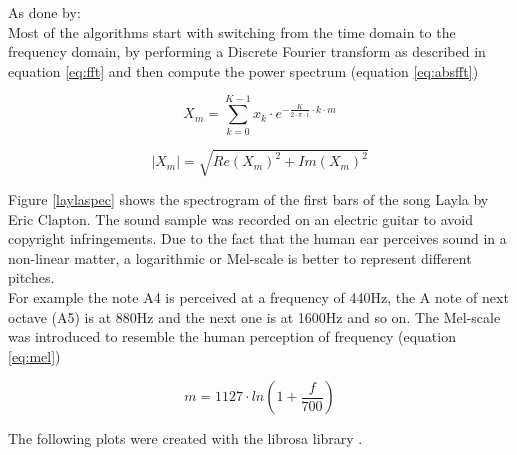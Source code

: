 As done by: \cite[pp. 17ff]{schnitzer1}\\
Most of the algorithms start with switching from the time domain to the frequency domain, by performing a Discrete Fourier transform as described in equation \ref{eq:fft} and then compute the power spectrum (equation \ref{eq:absfft})

\begin{equation} \label{eq:fft}
X_m = \sum_{k=0}^{K-1}{x_k \cdot e^ { - \frac{K}{ 2 \cdot \pi \cdot i}\cdot k\cdot m}}
\end{equation}

\begin{equation} \label{eq:absfft}
|X_m| = \sqrt{Re(X_m)^2 + Im(X_m)^2}
\end{equation}

Figure \ref{laylaspec} shows the spectrogram of the first bars of the song Layla by Eric Clapton. The sound sample was recorded on an electric guitar to avoid copyright infringements. 
Due to the fact that the human ear perceives sound in a non-linear matter, a logarithmic or Mel-scale is better to represent different pitches.\\ 
For example the note A4 is perceived at a frequency of 440Hz, the A note of next octave (A5) is at 880Hz and the next one is at 1600Hz and so on. 
The Mel-scale \cite[pp. 53f]{knees1} was introduced to resemble the human perception of frequency (equation \ref{eq:mel})

\begin{equation} \label{eq:mel}
m = 1127 \cdot ln(1 + \frac{f}{700})
\end{equation}

The following plots were created with the librosa library \cite{librosa1}.

